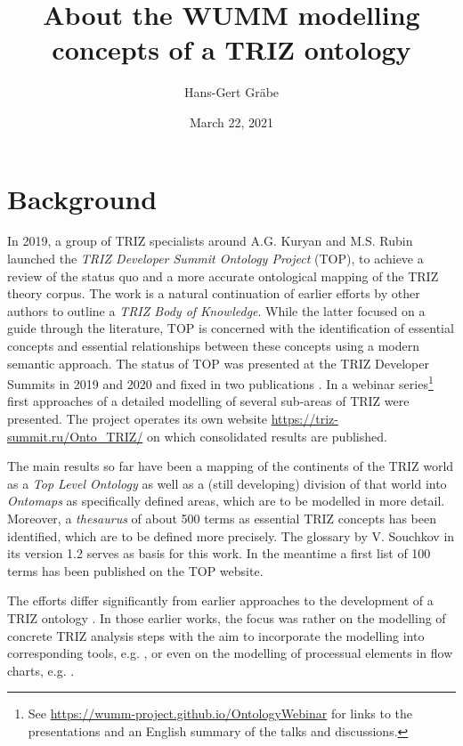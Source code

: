\documentclass[11pt,a4paper]{article}
\title{About the WUMM modelling concepts of a TRIZ ontology}
\author{Hans-Gert Gr\"abe}
\date{March 22,  2021}
\begin{document}
\maketitle

\section{Background}

In 2019, a group of TRIZ specialists around A.G. Kuryan and M.S. Rubin
launched the \emph{TRIZ Developer Summit Ontology Project} (TOP), to achieve a
review of the status quo and a more accurate ontological mapping of the TRIZ
theory corpus. The work is a natural continuation of earlier efforts by other
authors \cite{TBK2007, TBK2012} to outline a \emph{TRIZ Body of Knowledge}.
While the latter focused on a guide through the literature, TOP is concerned
with the identification of essential concepts and essential relationships
between these concepts using a modern semantic approach. The status of TOP was
presented at the TRIZ Developer Summits in 2019 and 2020 and fixed in two
publications \cite{TOP2019, TOP2020}. In a webinar series\footnote{See
  \url{https://wumm-project.github.io/OntologyWebinar} for links to the
  presentations and an English summary of the talks and discussions.}  first
approaches of a detailed modelling of several sub-areas of TRIZ were
presented.  The project operates its own website
\url{https://triz-summit.ru/Onto_TRIZ/} on which consolidated results are
published.

The main results so far have been a mapping of the continents of the TRIZ
world as a \emph{Top Level Ontology} as well as a (still developing) division
of that world into \emph{Ontomaps} as specifically defined areas, which are to
be modelled in more detail. Moreover, a \emph{thesaurus} of about 500 terms as
essential TRIZ concepts has been identified, which are to be defined more
precisely. The glossary \cite{Souchkov2018} by V. Souchkov in its version 1.2
serves as basis for this work. In the meantime a first list of 100 terms
\cite{TOP-Glossary} has been published on the TOP website.

The efforts differ significantly from earlier approaches to the development of
a TRIZ ontology \cite{Bultey2007, Bultey2015, Cavallucci2011, Dubois2007,
  Zanni2009, Zanni2013}. In those earlier works, the focus was rather on the
modelling of concrete TRIZ analysis steps with the aim to incorporate the
modelling into corresponding tools, e.g. \cite{Cavallucci2011}, or even on the
modelling of processual elements in flow charts, e.g. \cite{Bultey2015}.
\end{document}
